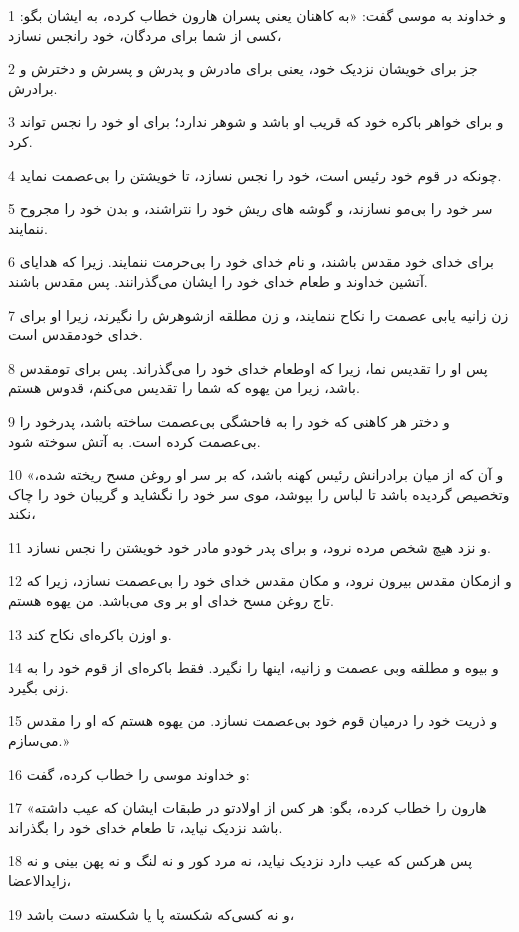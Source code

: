 \par 1 و خداوند به موسی گفت: «به کاهنان یعنی پسران هارون خطاب کرده، به ایشان بگو: کسی از شما برای مردگان، خود رانجس نسازد،
\par 2 جز برای خویشان نزدیک خود، یعنی برای مادرش و پدرش و پسرش و دخترش و برادرش.
\par 3 و برای خواهر باکره خود که قریب او باشد و شوهر ندارد؛ برای او خود را نجس تواند کرد.
\par 4 چونکه در قوم خود رئیس است، خود را نجس نسازد، تا خویشتن را بی‌عصمت نماید.
\par 5 سر خود را بی‌مو نسازند، و گوشه های ریش خود را نتراشند، و بدن خود را مجروح ننمایند.
\par 6 برای خدای خود مقدس باشند، و نام خدای خود را بی‌حرمت ننمایند. زیرا که هدایای آتشین خداوند و طعام خدای خود را ایشان می‌گذرانند. پس مقدس باشند.
\par 7 زن زانیه یابی عصمت را نکاح ننمایند، و زن مطلقه ازشوهرش را نگیرند، زیرا او برای خدای خودمقدس است.
\par 8 پس او را تقدیس نما، زیرا که اوطعام خدای خود را می‌گذراند. پس برای تومقدس باشد، زیرا من یهوه که شما را تقدیس می‌کنم، قدوس هستم.
\par 9 و دختر هر کاهنی که خود را به فاحشگی بی‌عصمت ساخته باشد، پدرخود را بی‌عصمت کرده است. به آتش سوخته شود.
\par 10 «و آن که از میان برادرانش رئیس کهنه باشد، که بر سر او روغن مسح ریخته شده، وتخصیص گردیده باشد تا لباس را بپوشد، موی سر خود را نگشاید و گریبان خود را چاک نکند،
\par 11 و نزد هیچ شخص مرده نرود، و برای پدر خودو مادر خود خویشتن را نجس نسازد.
\par 12 و ازمکان مقدس بیرون نرود، و مکان مقدس خدای خود را بی‌عصمت نسازد، زیرا که تاج روغن مسح خدای او بر وی می‌باشد. من یهوه هستم.
\par 13 و اوزن باکره‌ای نکاح کند.
\par 14 و بیوه و مطلقه وبی عصمت و زانیه، اینها را نگیرد. فقط باکره‌ای از قوم خود را به زنی بگیرد.
\par 15 و ذریت خود را درمیان قوم خود بی‌عصمت نسازد. من یهوه هستم که او را مقدس می‌سازم.»
\par 16 و خداوند موسی را خطاب کرده، گفت:
\par 17 «هارون را خطاب کرده، بگو: هر کس از اولادتو در طبقات ایشان که عیب داشته باشد نزدیک نیاید، تا طعام خدای خود را بگذراند.
\par 18 پس هرکس که عیب دارد نزدیک نیاید، نه مرد کور و نه لنگ و نه پهن بینی و نه زایدالاعضا،
\par 19 و نه کسی‌که شکسته پا یا شکسته دست باشد،

